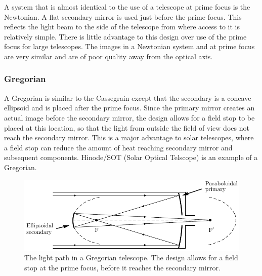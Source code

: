 A system that is almost identical
to the use of a telescope at prime focus is the Newtonian. A 
flat secondary mirror is used just before the prime focus. This reflects the
light beam to the side of the telescope from where access to it is relatively
simple. There is little advantage to this design over use of the prime focus
for large telescopes. The images in a Newtonian system and at prime focus 
are very similar and are of poor quality away from the optical axis.

\subsubsection{Gregorian}
A Gregorian is similar to the Cassegrain except that the secondary is a
concave ellipsoid and is placed after the prime focus. Since the primary 
mirror creates an actual image before the secondary mirror, the design
allows for a field stop to be placed at this location, so that the light from outside
the field of view does not reach the secondary mirror. This is a major advantage
to solar telescopes, where a field stop can reduce the amount of heat reaching secondary
mirror and subsequent components. Hinode/SOT (Solar Optical Telscope) is an 
example of a Gregorian.
%
\begin{figure}[htpb]
	\centering
	\includegraphics[scale=1.0]{gregorian_telescope.pdf}
	\caption{The light path in a Gregorian telescope. The design allows for a field stop at
	the prime focus, before it reaches the secondary mirror.}
	\label{fig:gregorian_telescope}
\end{figure}


